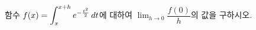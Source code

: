 함수 $f(x)=\displaystyle\int_{x}^{x+h}e^{-\frac{t^2}{2}}\mkern3mu dt$에 대하여 $\displaystyle\lim_{h\to 0}\dfrac{f(0)}{h}$의 값을 구하시오.
